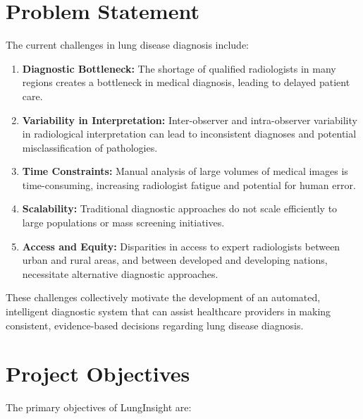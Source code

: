 {\section{Problem Statement}

The current challenges in lung disease diagnosis include:

\begin{enumerate}
    \item \textbf{Diagnostic Bottleneck:} The shortage of qualified radiologists in many regions creates a bottleneck in medical diagnosis, leading to delayed patient care.
    \item \textbf{Variability in Interpretation:} Inter-observer and intra-observer variability in radiological interpretation can lead to inconsistent diagnoses and potential misclassification of pathologies.
    \item \textbf{Time Constraints:} Manual analysis of large volumes of medical images is time-consuming, increasing radiologist fatigue and potential for human error.
    \item \textbf{Scalability:} Traditional diagnostic approaches do not scale efficiently to large populations or mass screening initiatives.
    \item \textbf{Access and Equity:} Disparities in access to expert radiologists between urban and rural areas, and between developed and developing nations, necessitate alternative diagnostic approaches.
\end{enumerate}

These challenges collectively motivate the development of an automated, intelligent diagnostic system that can assist healthcare providers in making consistent, evidence-based decisions regarding lung disease diagnosis.

\section{Project Objectives}

The primary objectives of LungInsight are:

}
